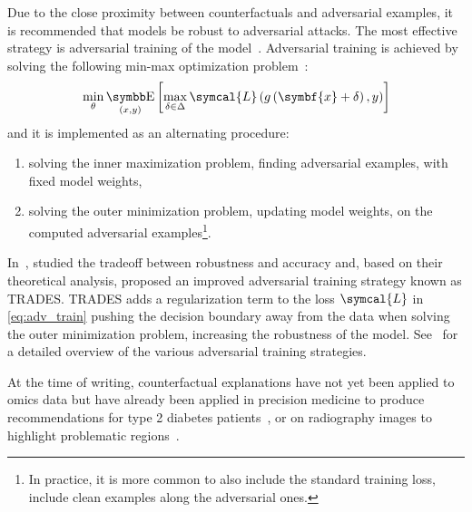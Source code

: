 \documentclass[../main.tex]{subfiles}
\begin{document}
	Due to the close proximity between counterfactuals and adversarial examples, it is recommended that models be robust to adversarial attacks.
	The most effective strategy is adversarial training of the model~\cite{huang2016learningstrongadversary}.
	Adversarial training is achieved by solving the following min-max optimization problem~\cite{AdvTrainingMinMax}:
	\begin{equation}
	    \min_{\theta} \E_{(x,y)}\left[\max_{\delta \in \Delta} \symcal{L}\left(g\left(\symbf{x}+\delta\right), y \right)  \right] \label{eq:adv_train}
	\end{equation}
	and it is implemented as an alternating procedure:
	\begin{enumerate}[nosep]
	    \item solving the inner maximization problem, \ie{}finding adversarial examples, with fixed model weights,
	    \item solving the outer minimization problem, \ie{}updating model weights, on the computed adversarial examples\footnote{In practice, it is more common to also include the standard training loss, \ie{}include clean examples along the adversarial ones.}.
	\end{enumerate}
	In~\cite{TRADES}, \citeauthor{TRADES} studied the tradeoff between robustness and accuracy and, based on their theoretical analysis, proposed an improved adversarial training strategy known as TRADES\@.
	TRADES adds a regularization term to the loss \(\symcal{L}\) in \cref{eq:adv_train} pushing the decision boundary away from the data when solving the outer minimization problem, \ie{}increasing the robustness of the model.
	See~\cite{AdvTrainSurvey} for a detailed overview of the various adversarial training strategies.

	At the time of writing, counterfactual explanations have not yet been applied to omics data but have already been applied in precision medicine to produce recommendations for type 2 diabetes patients~\cite{Lenatti2022}, or on radiography images to highlight problematic regions~\cite{Thiagarajan2022,Mertes2022}.

\end{document}
